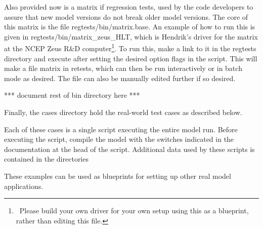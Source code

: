 \begin{flist}
\end{flist}

\noindent
Also provided now is a matrix if regression tests, used by the code developers
to assure that new model versions do not break older model versions. The core
of this matrix is the file {\file regtests/bin/matrix.base}. An example of how
to run this is given in {\file regtests/bin/matrix\_zeus\_HLT}, which is
Hendrik's driver for the matrix at the NCEP Zeus R\&D
computer\footnote{~Please build your own driver for your own setup using this
  as a blueprint, rather than editing this file.}. To run this, make a link to
it in the {\file regtests} directory and execute after setting the desired
option flags in the script. This will make a file {\file matrix} in {\file
  retests}, which can then be run interactively or in batch mode as
desired. The file can also be manually edited further if so desired.


\vspace{\baselineskip}
\centerline{*** document rest of {\file bin} directory here ***}

\vspace{\baselineskip} \noindent Finally, the {\file cases} directory hold the
real-world test cases as described below.

\begin{flist}
\end{flist}

\noindent
Each of these cases is a single script executing the entire model run. Before
executing the script, compile the model with the switches indicated in the
documentation at the head of the script. Additional data used by these scripts
is contained in the directories

\begin{flist}
\end{flist}

\noindent
These examples can be used as blueprints for setting up other real model
applications. 


